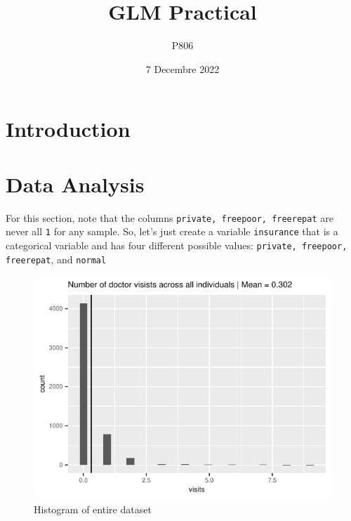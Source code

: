 \documentclass[a4paper,11pt]{article}
\title{GLM Practical}
\author{P806}
\date{7 Decembre 2022}
\begin{document}
\maketitle

\section{Introduction}

\section{Data Analysis}
For this section, note that the columns \texttt{private, freepoor, freerepat} are never all \texttt{1} for any sample. So, let's just create a variable \texttt{insurance} that is a categorical variable and has four different possible values: \texttt{private, freepoor, freerepat}, and \texttt{normal} 

\begin{figure}[h]
	\centering
	\includegraphics{../plots/histogram_of_visits.pdf}
	\caption{Histogram of entire dataset}
	\label{fig:hist_all}
\end{figure}
\end{document}
